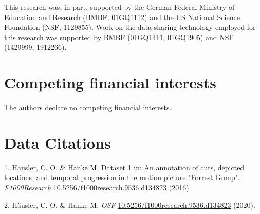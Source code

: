 \documentclass[english]{article}
\begin{document}
This research was, in part, supported by the German Federal Ministry of
Education and Research (BMBF, 01GQ1112) and the US National Science Foundation
(NSF, 1129855). Work on the data-sharing technology employed for this research
was supported by BMBF (01GQ1411, 01GQ1905) and NSF (1429999, 1912266).

\section*{Competing financial interests}
The authors declare no competing financial interests.


{\small
}

%
%


\section{Data Citations}

1. Häusler, C. O. \& Hanke M. Dataset 1 in: An annotation of cuts, depicted
locations, and temporal progression in the motion picture "Forrest Gump".
\emph{F1000Research}
\href{https://doi.org/10.5256/f1000research.9536.d134823}{10.5256/f1000research.9536.d134823}
(2016)

2. Häusler, C. O. \& Hanke M. \emph{OSF}
\href{https://doi.org/10.17605/OSF.IO/GFRME}{10.5256/f1000research.9536.d134823}
(2020).
\end{document}
